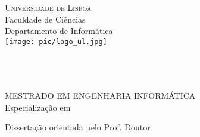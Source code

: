\begin{center}
\vspace{3cm}\normalfont\normalfont
\textsc{\huge{Universidade de Lisboa}}\\
\LARGE{Faculdade de Ci\^{e}ncias}\\
\Large{Departamento de Inform\'{a}tica}\\
\vspace{1cm}
\texttt{[image: pic/logo\_ul.jpg]}\\
\vspace{2cm}
\PEIIdiomaTese
\Large{\bf \PEITITULO}\\
\vspace{1.5 cm}
\Large{\bf \PEIAutor}\\
\vspace{2 cm}
\Large{\bf \PEITIPO}\\
\end{center}
\vspace{0.5 cm}
\begin{center}
\Large{MESTRADO EM ENGENHARIA INFORM\'{A}TICA}\\
\large{Especializa\c{c}\~{a}o em \MEIEspecializacao}\\
\end{center}
\vspace{1 cm}
Disserta\c{c}\~{a}o orientada pelo Prof. Doutor \PEIOrientador \\
\vfill
\begin{center}
\large\PEIAno
\end{center}
\newpage
\thispagestyle{empty}
\mbox{}
\newpage
